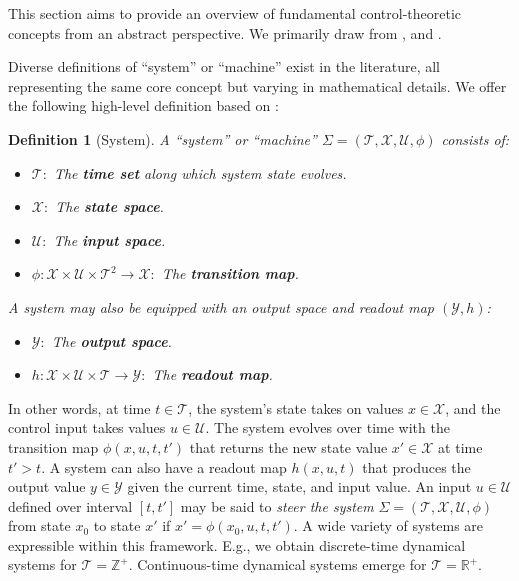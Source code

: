 \documentclass{article} %
\newtheorem{definition}{Definition}
\begin{document}
This section aims to provide an overview of fundamental control-theoretic concepts from an abstract perspective. We primarily draw from \cite{control_bible, kalman1969topics}, and \cite{ogata2010modern}.

Diverse definitions of ``system'' or ``machine'' exist in the literature, all representing the same core concept but varying in mathematical details. We offer the following high-level definition based on \cite{control_bible}: 

\begin{definition}[System] \label{def:system}
A ``system'' or ``machine'' $\Sigma = (\mathcal{T, X, U}, \phi)$ consists of: 
\begin{itemize}
    \item $\mathcal T:$ The \textbf{time set} along which system state evolves. 
    \item $\mathcal X: $ The \textbf{state space}.
    \item $\mathcal U:$ The \textbf{input space}.
    \item $\phi: \mathcal{X \times U \times T}^2 \to \mathcal X: $ The \textbf{transition map}. 
\end{itemize}
A system may also be equipped with an output space and readout map $(\mathcal Y, h)$: 
\begin{itemize}
    \item $\mathcal Y:$ The \textbf{output space}. 
    \item $h: \mathcal{X \times U \times T}\to \mathcal Y: $ The \textbf{readout map}.
\end{itemize}
\end{definition}
In other words, at time $t\in \mathcal T$, the system's state takes on values $x \in \mathcal X$, and the control input takes values $u \in \mathcal U$. The system evolves over time with the transition map $\phi(x, u, t, t')$ that returns the new state value $x'\in \mathcal X$ at time $t'>t$. A system can also have a readout map $h(x, u, t)$ that produces the output value $y\in \mathcal Y$ given the current time, state, and input value. An input $u\in \mathcal U$ defined over interval $[t, t']$ may be said to \textit{steer the system} $\Sigma = (\mathcal{T, X, U}, \phi)$ from state $x_0$ to state $x'$ if $x' = \phi(x_0, u, t, t')$. A wide variety of systems are expressible within this framework. E.g., we obtain discrete-time dynamical systems for $\mathcal T = \mathbb Z^+$. Continuous-time dynamical systems emerge for $\mathcal T = \mathbb R^+$. 
\end{document}
